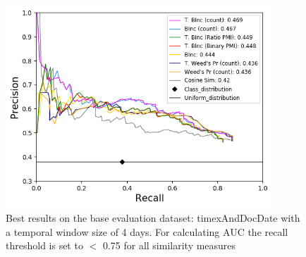 \documentclass[11pt]{article}
\begin{document}

\begin{figure}[h]
\begin{center}
\includegraphics[width=10cm]{4day_window_timexAndDocDate_extra_sims_dis0_dis1_pr_curve.png}
\end{center}
\caption{Best results on the base evaluation dataset: timexAndDocDate with a temporal window size of 4 days. For calculating AUC the recall threshold is set to $<$ 0.75 for all similarity measures}
\label{fig:best_graph}
\end{figure}
\end{document}
